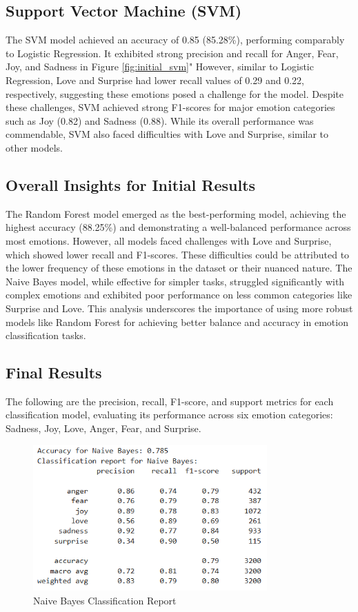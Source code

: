 \subsection{Support Vector Machine (SVM)}
The SVM model achieved an accuracy of 0.85 (85.28\%), performing comparably to Logistic Regression. It exhibited strong precision and recall for Anger, Fear, Joy, and Sadness in Figure \ref{fig:initial_svm}" However, similar to Logistic Regression, Love and Surprise had lower recall values of 0.29 and 0.22, respectively, suggesting these emotions posed a challenge for the model. Despite these challenges, SVM achieved strong F1-scores for major emotion categories such as Joy (0.82) and Sadness (0.88). While its overall performance was commendable, SVM also faced difficulties with Love and Surprise, similar to other models.

\subsection{Overall Insights for Initial Results}
The Random Forest model emerged as the best-performing model, achieving the highest accuracy (88.25\%) and demonstrating a well-balanced performance across most emotions. However, all models faced challenges with Love and Surprise, which showed lower recall and F1-scores. These difficulties could be attributed to the lower frequency of these emotions in the dataset or their nuanced nature. The Naive Bayes model, while effective for simpler tasks, struggled significantly with complex emotions and exhibited poor performance on less common categories like Surprise and Love. This analysis underscores the importance of using more robust models like Random Forest for achieving better balance and accuracy in emotion classification tasks.

       
\subsection{Final Results}
The following are the precision, recall, F1-score, and support metrics for each classification model, evaluating its performance across six emotion categories: Sadness, Joy, Love, Anger, Fear, and Surprise.

\begin{figure}[h!]
\centering
\includegraphics[width=0.8\textwidth]{naive_bayes_result.png}
\caption{Naive Bayes Classification Report}
\label{fig:naive_bayes}
\end{figure}

